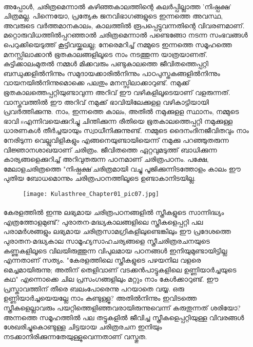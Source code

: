 \paragraph{}	അപ്പോൾ, ചരിത്രമെന്നാൽ കഴിഞ്ഞകാലത്തിന്റെ കലർപ്പില്ലാത്ത 'നിഷ്പക്ഷ' ചിത്രമല്ല. പിന്നെയോ, പ്രത്യേക ജനവിഭാഗങ്ങളുടെ ഇന്നത്തെ അവസ്ഥ, അവരുടെ വർത്തമാനകാലം, കാലത്തിൽ രൂപപ്പെട്ടുവന്നതിന്റെ വിവരണമാണ്. മറ്റൊരുവിധത്തിൽപ്പറഞ്ഞാൽ ചരിത്രമെന്നാൽ പണ്ടെങ്ങോ നടന്ന സംഭവങ്ങൾ പെറുക്കിയെടുത്ത് കൂട്ടിവയ്ക്കലല്ല; നേരെമറിച്ച് നമ്മുടെ ഇന്നത്തെ സമൂഹത്തെ മനസ്സിലാക്കാൻ ഭൂതകാലങ്ങളിലൂടെ നാം നടത്തുന്ന യാത്രയാണത്. കുട്ടിക്കാലംമുതൽ നമ്മൾ മിക്കവരും പണ്ടുകാലത്തെ ജീവിതത്തെപ്പറ്റി ബന്ധുക്കളിൽനിന്നും സമുദായക്കാരിൽനിന്നും പാഠപുസ്തകങ്ങളിൽനിന്നും വായനയിൽനിന്നുമൊക്കെ പലതും മനസ്സിലാക്കാറുണ്ട്. നമുക്ക് ഭൂതകാലത്തെപ്പറ്റിയുണ്ടാവുന്ന അറിവ് ഈ വഴികളിലൂടെയാണ് വളരുന്നത്. വാസ്തവത്തിൽ ഈ അറിവ് നമുക്ക് ഭാവിയിലേക്കുളള വഴികാട്ടിയായി പ്രവർത്തിക്കുന്നു. നാം, ഇന്നത്തെ കാലം, അതിൽ നമുക്കുളള സ്ഥാനം, നമ്മുടെ ഭാവി sഎന്നിവയെക്കുറിച്ചു ചിന്തിക്കുന്ന രീതിയെ ഭൂതകാലത്തെപ്പറ്റി നമുക്കുള്ള ധാരണകൾ തീർച്ചയായും സ്വാധീനിക്കുന്നുണ്ട്. നമ്മുടെ ദൈനംദിനജീവിതവും നാം നേരിടുന്ന വെല്ലുവിളികളും എങ്ങനെയുണ്ടായിയെന്ന് നമുക്കു പറഞ്ഞുതരുന്ന വിജ്ഞാനശാഖയാണ് ചരിത്രം. ജീവിതത്തെ ഏറ്റവുമടുത്ത് ബാധിക്കുന്ന കാര്യങ്ങളെക്കുറിച്ച് അറിവുതരുന്ന പഠനമാണ് ചരിത്രപഠനം. പക്ഷേ, മേലാളചരിത്രത്തെ "നിഷ്പക്ഷ'ചരിത്രമായി വച്ചു പൂജിക്കുന്നിടത്തോളം കാലം ഈ പുതിയ ബോധമൊന്നും ചരിത്രപഠനത്തിലൂടെ ഉണ്ടാകാനിടയില്ല.

\begin{figure}[h]
\begin{center}
\texttt{[image: Kulasthree\_Chapter01\_pic07.jpg]}
\end{center}
\end{figure}

\paragraph{}	കേരളത്തിൽ ഇന്നു ലഭ്യമായ ചരിത്രപഠനങ്ങളിൽ സ്ത്രീകളുടെ സാന്നിദ്ധ്യം എത്രത്തോളമുണ്ട്? പുരാതന-മദ്ധ്യകാലങ്ങളിലെ സ്ത്രീകളെപ്പറ്റി പല പരാമർശങ്ങളും ലഭ്യമായ ചരിത്രസാമഗ്രികളിലുണ്ടെങ്കിലും ഈ പ്രദേശത്തെ പുരാതന-മദ്ധ്യകാല സാമൂഹ്യസാഹചര്യങ്ങളെ സ്ത്രീചരിത്രരചനയുടെ കണ്ണുകളിലൂടെ വിലയിരുത്തുന്ന വിപുലമായ പഠനങ്ങൾ ഇനിയുമുണ്ടായിട്ടില്ല എന്നതാണ് സത്യം. "കേരളത്തിലെ സ്ത്രീകളുടെ പഴയനില വളരെ മെച്ചമായിരുന്നു; അതിന് തെളിവാണ് വടക്കൻപാട്ടുകളിലെ ഉണ്ണിയാർച്ചയുടെ കഥ" എന്നൊക്കെ ചില പ്രസംഗങ്ങളിലും മറ്റും നാം കേൾക്കാറുണ്ട്. ഈ പ്രസ്താവത്തിന് തീരെ ബലംപോരെന്നു പറയാതെ വയ്യ. ഒരു ഉണ്ണിയാർച്ചയെയല്ലേ നാം കണ്ടുള്ളൂ? അതിൽനിന്നും ഇവിടത്തെ സ്ത്രീകളെല്ലാവരും പയറ്റിത്തെളിഞ്ഞവരായിരുന്നുവെന്ന് കരുതുന്നത് ശരിയോ? അന്നത്തെ സമൂഹത്തിൽ പല തട്ടുകളിൽ ജീവിച്ച സ്ത്രീകളെപ്പറ്റിയുള്ള വിവരങ്ങൾ ശേഖരിച്ചുകൊണ്ടുള്ള ചിട്ടയായ ചരിത്രരചന ഇനിയും നടക്കാനിരിക്കുന്നതേയുള്ളുവെന്നതാണ് വസ്തുത.

